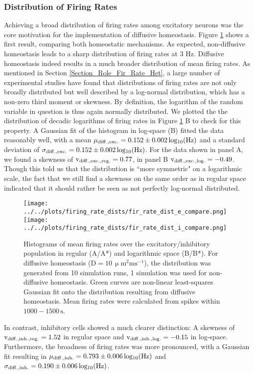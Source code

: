 \documentclass[10pt,a4paper]{article}
\begin{document}
\subsubsection{Distribution of Firing Rates}\label{Fir_Dist_Section}
Achieving a broad distribution of firing rates among excitatory neurons was the core motivation for the implementation of diffusive homeostasis. Figure \ref{Fir_Rate_Dist_Compare} shows a first result, comparing both homeostatic mechanisms. As expected, non-diffusive homeostasis leads to a sharp distribution of firing rates at 3 Hz. Diffusive homeostasis indeed results in a much broader distribution of mean firing rates. As mentioned in Section \ref{Section_Role_Fir_Rate_Het}, a large number of experimental studies have found that distributions of firing rates are not only broadly distributed but well described by a log-normal distribution, which has a non-zero third moment or skewness. By definition, the logarithm of the random variable in question is thus again normally distributed. We plotted the the distribution of decadic logarithms of firing rates in Figure \ref{Fir_Rate_Dist_Compare} B to check for this property. A Gaussian fit of the histogram in log-space (B) fitted the data reasonably well, with a mean $\mu_{\rm diff.,exc.} = \rm 0.152 \pm  0.002\, log_{10}(Hz)$ and a standard deviation of $\sigma_{\rm diff.,exc.} = \rm 0.152 \pm  0.002\, log_{10}(Hz)$. For the data shown in panel A, we found a skewness of $\mathrm{v_{\rm diff.,exc.,reg.} = 0.77}$, in panel B $\mathrm{v_{\rm diff.,exc.,log.} = -0.49}$. Though this told us that the distribution is ``more symmetric" on a logarithmic scale, the fact that we still find a skewness on the same order as in regular space indicated that it should rather be seen as not perfectly log-normal distributed.  
\begin{figure}
\texttt{[image: ../../plots/firing\_rate\_dists/fir\_rate\_dist\_e\_compare.png]}
\texttt{[image: ../../plots/firing\_rate\_dists/fir\_rate\_dist\_i\_compare.png]}
\caption[Histograms of mean firing rates over the excitatory/inhibitory population]{Histograms of mean firing rates over the excitatory/inhibitory population in regular (A/A*) and logarithmic space (B/B*). For diffusive homeostasis ($\mathrm{D=10\, \upmu m^2 ms^{-1}}$), the distribution was generated from 10 simulation runs, 1 simulation was used for non-diffusive homeostasis. Green curves are non-linear least-squares Gaussian fit onto the distribution resulting from diffusive homeostasis. Mean firing rates were calculated from spikes within $\mathrm{1000-1500\,s}$.}
\label{Fir_Rate_Dist_Compare}
\end{figure}
In contrast, inhibitory cells showed a much clearer distinction: A skewness of $\mathrm{v_{\rm diff.,inh.,reg.} = 1.52}$ in regular space and $\mathrm{v_{\rm diff.,inh.,log.} = -0.15}$ in log-space. Furthermore, the broadness of firing rates was more pronounced, with a Gaussian fit resulting in $\mu_{\rm diff.,inh.} = \rm 0.793 \pm  0.006\, log_{10}(Hz)$ and $\sigma_{\rm diff.,inh.} = \rm 0.190 \pm  0.006\, log_{10}(Hz)$.
\end{document}
